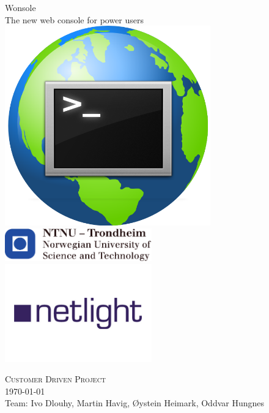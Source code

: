 \documentclass[10pt,a4paper,oneside]{report}
\begin{document}
\thispagestyle{empty}
\begin{center}
	{\Huge Wonsole} \\
	\medskip
	{\LARGE The new web console for power users} \\ 
	\includegraphics[width=3.5in]{image/wonsole-logo.png} \\
	\includegraphics[width=2.5in]{image/logo-ntnu.pdf} \\
	\includegraphics[width=2.5in]{image/logo-netlight.png}
\end{center}
{\Large \textsc{Customer Driven Project}} \\
{\large \today \\Team: Ivo Dlouhy, Martin Havig, Øystein Heimark, Oddvar Hungnes}
\newpage
\end{document}
